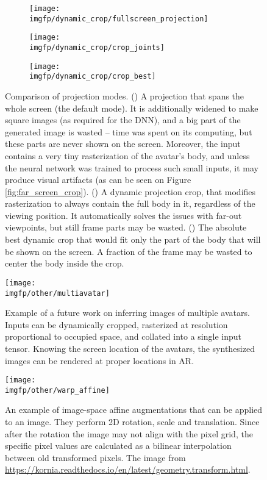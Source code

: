 \begin{figure}
	\centering
	\begin{subfigure}[b]{0.45\textwidth}
		\centering
		\texttt{[image: \\imgfp/dynamic\_crop/fullscreen\_projection]}%
		\caption{}
		\label{fig:explain_crop_fullscreen}
	\end{subfigure}
	\hfill
	\begin{subfigure}[b]{0.27\textwidth}
		\centering
		\texttt{[image: \\imgfp/dynamic\_crop/crop\_joints]}
		\caption{}
		\label{fig:explain_crop_joints}
	\end{subfigure}
	\hfill
	\begin{subfigure}[b]{0.25\textwidth}
		\centering
		\texttt{[image: \\imgfp/dynamic\_crop/crop\_best]}
		\caption{}
		\label{fig:explain_crop_best}
	\end{subfigure}
	\caption{Comparison of projection modes. (\protect{}) A projection that spans the whole screen (the default mode). It is additionally widened to make square images (as required for the DNN), and a big part of the generated image is wasted -- time was spent on its computing, but these parts are never shown on the screen. Moreover, the input contains a very tiny rasterization of the avatar's body, and unless the neural network was trained to process such small inputs, it may produce visual artifacts (as can be seen on Figure \ref{fig:far_screen_crop}). (\protect{}) A dynamic projection crop, that modifies rasterization to always contain the full body in it, regardless of the viewing position. It automatically solves the issues with far-out viewpoints, but still frame parts may be wasted. (\protect{}) The absolute best dynamic crop that would fit only the part of the body that will be shown on the screen. A fraction of the frame may be wasted to center the body inside the crop. }
\end{figure}
\begin{figure}
	\centering%
	\setlength\abovedisplayskip{0pt}%
	\texttt{[image: \\imgfp/other/multiavatar]}%
	\caption{Example of a future work on inferring images of multiple avatars. Inputs can be dynamically cropped, rasterized at resolution proportional to occupied space, and collated into a single input tensor. Knowing the screen location of the avatars, the synthesized images can be rendered at proper locations in AR.}%
	\label{fig:multiavatar}%
	\setlength\belowdisplayskip{0pt}%
\end{figure}
\begin{figure}
	\centering
	\texttt{[image: \\imgfp/other/warp\_affine]}
	\caption{An example of image-space affine augmentations that can be applied to an image. They perform 2D rotation, scale and translation. Since after the rotation the image may not align with the pixel grid, the specific pixel values are calculated as a bilinear interpolation between old transformed pixels. The image from \href{https://kornia.readthedocs.io/en/latest/geometry.transform.html}{https://kornia.readthedocs.io/en/latest/geometry.transform.html}.}
	\label{fig:image-space-aug-kornia}
\end{figure}
